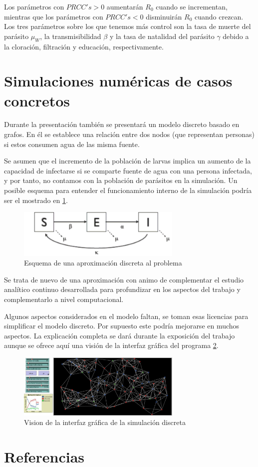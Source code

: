 \documentclass[1p]{elsarticle}
\begin{document}
 Los parámetros con $PRCC's> 0$ aumentarán $R_0$ cuando se incrementan, mientras que los parámetros con $PRCC's <0$ disminuirán $R_0$ cuando crezcan. Los tres parámetros sobre los que tenemos más control son la tasa de muerte del parásito $\mu_W$, la transmisibilidad $\beta $ y la tasa de natalidad del parásito $\gamma$ debido a la cloración, filtración y educación, respectivamente.

\section{Simulaciones numéricas de casos concretos}
Durante la presentación también se presentará un modelo discreto basado en grafos. En él se establece una relación entre dos nodos (que representan personas) si estos consumen agua de las misma fuente.

 Se asumen que el incremento de la población de larvas implica un aumento de la capacidad de infectarse si se comparte fuente de agua con una persona infectada, y por tanto, no contamos con la población de parásitos en la simulación. Un posible esquema para entender el funcionamiento interno de la simulación podría ser el mostrado en \ref{fig:2}.
\begin{figure}
	\centering
	\includegraphics[width=0.7\textwidth]{fig2.png}
	\caption{Esquema de una aproximación discreta al problema }
	\label{fig:2}
\end{figure}
Se trata de nuevo de una aproximación con animo de complementar el estudio analítico continuo desarrollada para profundizar en los aspectos del trabajo y complementarlo a nivel computacional. 

Algunos aspectos considerados en el modelo faltan, se toman esas licencias para simplificar el modelo discreto. Por supuesto este podría mejorarse en muchos aspectos. La explicación completa se dará durante la exposición del trabajo aunque se ofrece aquí una visión de la interfaz gráfica del programa \ref{fig:3}.
\begin{figure}
	\centering
	\includegraphics[width=0.7\textwidth]{fig3.jpg}
	\caption{Vision de la interfaz gráfica de la simulación discreta }
	\label{fig:3}
\end{figure}
\section*{Referencias}


\end{document}
